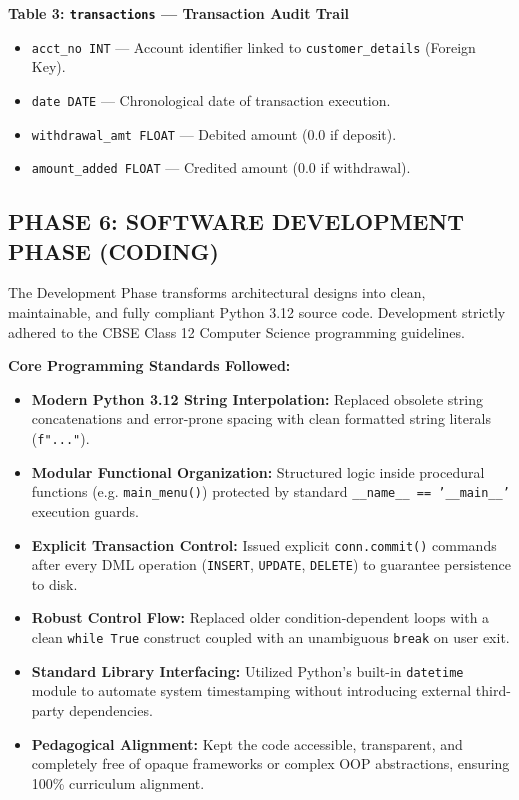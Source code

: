 \documentclass[12pt,a4paper]{article}
\begin{document}
\noindent\textbf{Table 3: \texttt{transactions} --- Transaction Audit Trail}
\begin{itemize}
    \item \texttt{acct\_no INT} --- Account identifier linked to \texttt{customer\_details} (Foreign Key).
    \item \texttt{date DATE} --- Chronological date of transaction execution.
    \item \texttt{withdrawal\_amt FLOAT} --- Debited amount (0.0 if deposit).
    \item \texttt{amount\_added FLOAT} --- Credited amount (0.0 if withdrawal).
\end{itemize}

\clearpage

\subsection*{PHASE 6: SOFTWARE DEVELOPMENT PHASE (CODING)}
The Development Phase transforms architectural designs into clean, maintainable, and fully compliant Python 3.12 source code. Development strictly adhered to the CBSE Class 12 Computer Science programming guidelines.

\vspace{0.6em}
\noindent\textbf{Core Programming Standards Followed:}
\begin{itemize}
    \item \textbf{Modern Python 3.12 String Interpolation:} Replaced obsolete string concatenations and error-prone spacing with clean formatted string literals (\texttt{f"..."}).
    \item \textbf{Modular Functional Organization:} Structured logic inside procedural functions (e.g. \texttt{main\_menu()}) protected by standard \texttt{\_\_name\_\_ == '\_\_main\_\_'} execution guards.
    \item \textbf{Explicit Transaction Control:} Issued explicit \texttt{conn.commit()} commands after every DML operation (\texttt{INSERT}, \texttt{UPDATE}, \texttt{DELETE}) to guarantee persistence to disk.
    \item \textbf{Robust Control Flow:} Replaced older condition-dependent loops with a clean \texttt{while True} construct coupled with an unambiguous \texttt{break} on user exit.
    \item \textbf{Standard Library Interfacing:} Utilized Python's built-in \texttt{datetime} module to automate system timestamping without introducing external third-party dependencies.
    \item \textbf{Pedagogical Alignment:} Kept the code accessible, transparent, and completely free of opaque frameworks or complex OOP abstractions, ensuring 100\% curriculum alignment.
\end{itemize}
\end{document}
